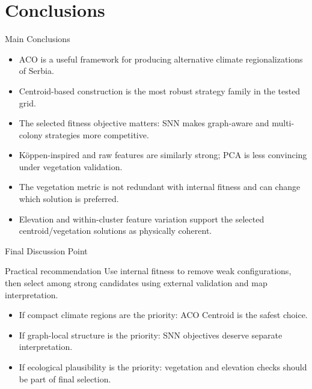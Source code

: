 \documentclass[aspectratio=169,10pt]{beamer}
\begin{document}
\section{Conclusions}

\begin{frame}{Main Conclusions}
  \begin{itemize}
    \item ACO is a useful framework for producing alternative climate regionalizations of Serbia.
    \item Centroid-based construction is the most robust strategy family in the tested grid.
    \item The selected fitness objective matters: SNN makes graph-aware and multi-colony strategies more competitive.
    \item K\"oppen-inspired and raw features are similarly strong; PCA is less convincing under vegetation validation.
    \item The vegetation metric is not redundant with internal fitness and can change which solution is preferred.
    \item Elevation and within-cluster feature variation support the selected centroid/vegetation solutions as physically coherent.
  \end{itemize}
\end{frame}

\begin{frame}{Final Discussion Point}
  \begin{block}{Practical recommendation}
    Use internal fitness to remove weak configurations, then select among strong candidates using external validation and map interpretation.
  \end{block}

  \vspace{1em}
  \begin{itemize}
    \item If compact climate regions are the priority: ACO Centroid is the safest choice.
    \item If graph-local structure is the priority: SNN objectives deserve separate interpretation.
    \item If ecological plausibility is the priority: vegetation and elevation checks should be part of final selection.
  \end{itemize}
\end{frame}
\end{document}
